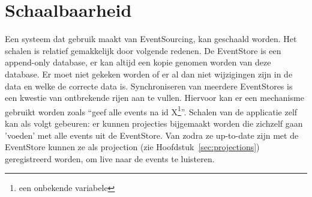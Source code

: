 
\chapter{Schaalbaarheid}
\label{ch:schaalbaarheid}

Een systeem dat gebruik maakt van EventSourcing, kan geschaald worden. Het schalen is relatief gemakkelijk door volgende redenen.
De EventStore is een append-only database, er kan altijd een kopie genomen worden van deze database. Er moet niet gekeken worden of er al dan niet wijzigingen zijn in de data en welke de correcte data is. Synchroniseren van meerdere EventStores is een kwestie van ontbrekende rijen aan te vullen. Hiervoor kan er een mechanisme gebruikt worden zoals ``geef alle events na id X\footnote{een onbekende variabele}''.
Schalen van de applicatie zelf kan als volgt gebeuren: er kunnen projecties bijgemaakt worden die zichzelf gaan 'voeden' met alle events uit de EventStore. Van zodra ze up-to-date zijn met de EventStore kunnen ze als projection (zie Hoofdstuk~\ref{sec:projections}) geregistreerd worden, om live naar de events te luisteren.